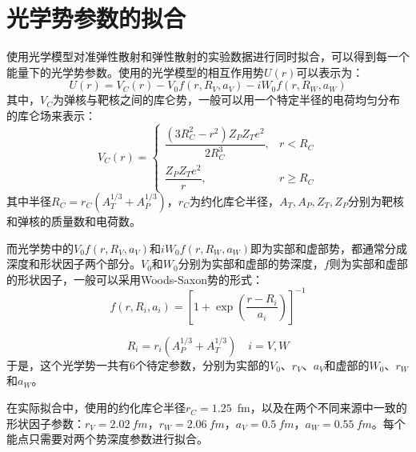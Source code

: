 \section{光学势参数的拟合}




使用光学模型对准弹性散射和弹性散射的实验数据进行同时拟合，可以得到每一个能量下的光学势参数。使用的光学模型的相互作用势$U(r)$可以表示为：
\begin{equation}
U(r)= V_C(r) - V_0f(r,R_V,a_V) - iW_0f(r,R_W,a_W)
\label{opt}
\end{equation}
其中，$V_C$为弹核与靶核之间的库仑势，一般可以用一个特定半径的电荷均匀分布的库仑场来表示：
\begin{equation}
V_C(r) = 
\begin{cases} 
\dfrac{(3R_C^2 - r^2) Z_P Z_T e^2}{2R_C^3}, & r < R_C \\[1em]
\dfrac{Z_P Z_T e^2}{r}, & r \geq R_C 
\end{cases}
\end{equation}
其中半径$R_C=r_C(A_T^{1/3}+A_P^{1/3})$，$r_C$为约化库仑半径，$A_T,A_P,Z_T,Z_P$分别为靶核和弹核的质量数和电荷数。

而光学势中的$V_0f(r,R_V,a_V)$和$iW_0f(r,R_W,a_W)$即为实部和虚部势，都通常分成深度和形状因子两个部分。$V_0$和$W_0$分别为实部和虚部的势深度，$f$则为实部和虚部的形状因子，一般可以采用Woods-Saxon势的形式：
\begin{equation}
f(r, R_i, a_i) = \left[ 1 + \exp\left(\frac{r - R_i}{a_i}\right) \right]^{-1}
\end{equation}

\begin{equation}
R_i = r_i(A_P^{1/3} + A_T^{1/3}) \quad i = V, W
\end{equation}
于是，这个光学势一共有6个待定参数，分别为实部的$V_0$、$r_V$、$a_V$和虚部的$W_0$、$r_W$和$a_W$。

在实际拟合中，使用的约化库仑半径$r_C=1.25$~fm\cite{kim1979nuclear}，以及在两个不同来源中一致的形状因子参数：$r_V=2.02~fm$，$r_W=2.06~fm$，$a_V=0.5~fm$，$a_W=0.55~fm$\cite{kim1979nuclear,talon1981coulomb}。每个能点只需要对两个势深度参数进行拟合。

